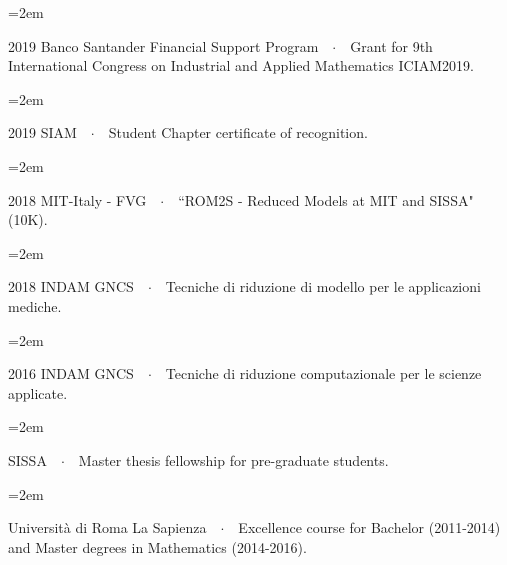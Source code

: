 \documentclass[
  usegeometry%
]{scrartcl}
\newcommand{\Description}[1]{\hangindent=2em\hangafter=0\noindent\raggedright\footnotesize{#1}\par\normalsize\vspace{1em}} %
\begin{document}
\begin{cv}{}
\vspace{-0.5em} %

\Description{{\color{violet}2019 Banco Santander Financial Support Program}\ \ $\cdotp$\ \   Grant for 9th International Congress on Industrial and Applied Mathematics ICIAM2019.}

\vspace{-0.5em} %

\Description{{\color{violet}2019 SIAM}\ \ $\cdotp$\ \  Student Chapter certificate of recognition.}

\vspace{-0.5em} %

\Description{{\color{violet}2018 MIT-Italy - FVG}\ \ $\cdotp$\ \  ``ROM2S - Reduced Models at MIT and SISSA" (10K).}

\vspace{-0.5em} %

\Description{{\color{violet}2018 INDAM GNCS}\ \ $\cdotp$\ \  Tecniche di riduzione di modello per le applicazioni mediche.}

\vspace{-0.5em} %
%
\Description{{\color{violet}2016 INDAM GNCS}\ \ $\cdotp$\ \  Tecniche di riduzione computazionale per le scienze applicate.}

\vspace{-0.5em} %

\Description{{\color{violet}SISSA}\ \ $\cdotp$\ \ Master thesis fellowship for pre-graduate students.}

\vspace{-0.5em} %

\Description{{\color{violet}Università di Roma La Sapienza}\ \ $\cdotp$\ \ Excellence course for Bachelor (2011-2014) and Master degrees in Mathematics (2014-2016).}



\end{cv}
\end{document}
